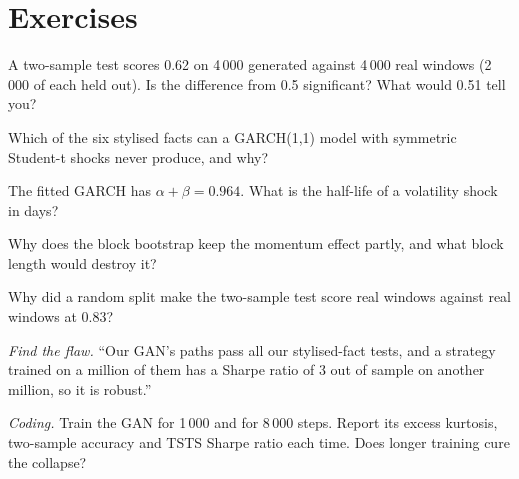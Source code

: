 \section{Exercises}

\begin{exercise}[$\star$]\label{exo:ml:generative-models-and-synthetic-data:1}
A two-sample test scores 0.62 on 4\,000 generated against 4\,000 real windows (2\,000 of each held out). Is the difference
from 0.5 significant? What would 0.51 tell you?
\end{exercise}

\begin{exercise}[$\star$]\label{exo:ml:generative-models-and-synthetic-data:2}
Which of the six stylised facts can a GARCH(1,1) model with symmetric Student-t shocks never produce, and why?
\end{exercise}

\begin{exercise}[$\star$]\label{exo:ml:generative-models-and-synthetic-data:3}
The fitted GARCH has $\alpha + \beta = 0.964$. What is the half-life of a volatility shock in days?
\end{exercise}

\begin{exercise}[$\star\star$]\label{exo:ml:generative-models-and-synthetic-data:4}
Why does the block bootstrap keep the momentum effect partly, and what block length would destroy it?
\end{exercise}

\begin{exercise}[$\star\star$]\label{exo:ml:generative-models-and-synthetic-data:5}
Why did a random split make the two-sample test score real windows against real windows at 0.83?
\end{exercise}

\begin{exercise}[$\star\star$]\label{exo:ml:generative-models-and-synthetic-data:6}
\emph{Find the flaw.} ``Our GAN's paths pass all our stylised-fact tests, and a strategy trained on a million of them has a
Sharpe ratio of 3 out of sample on another million, so it is robust.''
\end{exercise}

\begin{exercise}[$\star\star\star$]\label{exo:ml:generative-models-and-synthetic-data:7}
\emph{Coding.} Train the GAN for 1\,000 and for 8\,000 steps. Report its excess kurtosis, two-sample accuracy and TSTS
Sharpe ratio each time. Does longer training cure the collapse?
\end{exercise}

